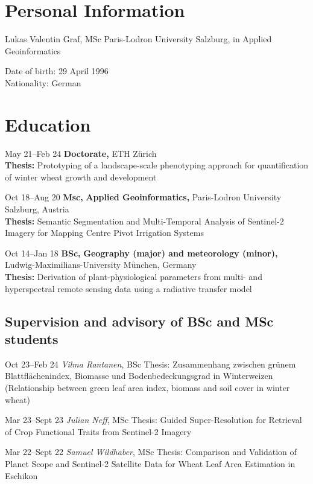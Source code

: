 \begin{cv}{}
\section{Personal Information}
  \begin{cvlist}{}
    \item Lukas Valentin Graf, MSc Paris-Lodron University Salzburg, in Applied Geoinformatics
    \item 
        Date of birth: 29 April 1996\\
        Nationality: German
  \end{cvlist}
  
 \section{Education}
  \begin{cvlist}{}
  \item[May 21--Feb 24] 
      \textbf{Doctorate,} {ETH Zürich}\\ 
      \textbf{Thesis:} {Prototyping of a landscape-scale phenotyping approach for quantification of winter wheat growth and development}
  \item[Oct 18--Aug 20] 
      \textbf{Msc,} {{\textbf{Applied Geoinformatics, }}}{Paris-Lodron University Salzburg, Austria}\\
      \textbf{Thesis:} {Semantic Segmentation and Multi-Temporal Analysis of Sentinel-2 Imagery for Mapping Centre Pivot Irrigation Systems}
  \item[Oct 14--Jan 18] 
      \textbf{BSc,} {{\textbf{Geography (major) and meteorology (minor), }} }{Ludwig-Maximilians-University München, Germany}\\ 
      \textbf{Thesis:} {Derivation of plant-physiological parameters from multi- and hyperspectral remote sensing data using a radiative transfer model}
  \end{cvlist}


\subsection{Supervision and advisory of BSc and MSc students}
\begin{cvlist}{}
    \item[Oct 23--Feb 24]
    {\textit{Vilma Rantanen}, }
    BSc Thesis: Zusammenhang zwischen grünem Blattflächenindex, Biomasse und Bodenbedeckungsgrad in Winterweizen (Relationship between green leaf area index, biomass and soil cover in winter wheat)
    \item[Mar 23--Sept 23]
    {\textit{Julian Neff}, }
    MSc Thesis: Guided Super-Resolution for Retrieval of Crop Functional Traits from Sentinel-2 Imagery
    \item[Mar 22--Sept 22]
    {\textit{Samuel Wildhaber}, }
    MSc Thesis: Comparison and Validation of Planet Scope and Sentinel-2 Satellite Data for Wheat Leaf Area Estimation in Eschikon
\end{cvlist}
  

\end{cv}
